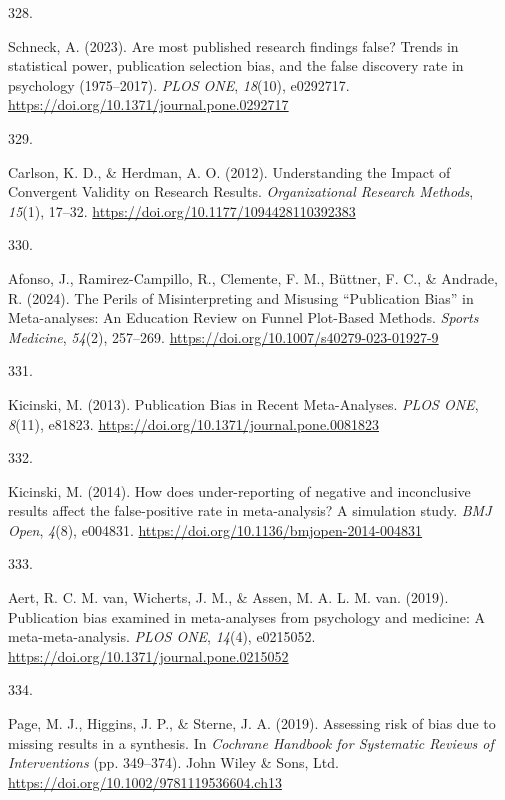 \documentclass[
  11pt,
  letterpaper,
]{scrreprt}
\newlength{\cslhangindent}
\newlength{\csllabelwidth}
\newenvironment{CSLReferences}[2] %
 {\begin{list}{}{%
  \setlength{\itemindent}{0pt}
  \setlength{\leftmargin}{0pt}
  \setlength{\parsep}{0pt}
  \ifodd #1
   \setlength{\leftmargin}{\cslhangindent}
   \setlength{\itemindent}{-1\cslhangindent}
  \fi
  \setlength{\itemsep}{#2\baselineskip}}}
 {\end{list}}
\newcommand{\CSLLeftMargin}[1]{\parbox[t]{\csllabelwidth}{\strut#1\strut}}
\newcommand{\CSLRightInline}[1]{\parbox[t]{\linewidth - \csllabelwidth}{\strut#1\strut}}
\begin{document}
\begin{CSLReferences}{0}{0}
\CSLLeftMargin{328. }%
\CSLRightInline{Schneck, A. (2023). Are most published research findings
false? {Trends} in statistical power, publication selection bias, and
the false discovery rate in psychology (1975--2017). \emph{PLOS ONE},
\emph{18}(10), e0292717.
\url{https://doi.org/10.1371/journal.pone.0292717}}

\CSLLeftMargin{329. }%
\CSLRightInline{Carlson, K. D., \& Herdman, A. O. (2012). Understanding
the {Impact} of {Convergent Validity} on {Research Results}.
\emph{Organizational Research Methods}, \emph{15}(1), 17--32.
\url{https://doi.org/10.1177/1094428110392383}}

\CSLLeftMargin{330. }%
\CSLRightInline{Afonso, J., Ramirez-Campillo, R., Clemente, F. M.,
Büttner, F. C., \& Andrade, R. (2024). The {Perils} of {Misinterpreting}
and {Misusing} {``{Publication Bias}''} in {Meta-analyses}: {An
Education Review} on {Funnel Plot-Based Methods}. \emph{Sports
Medicine}, \emph{54}(2), 257--269.
\url{https://doi.org/10.1007/s40279-023-01927-9}}

\CSLLeftMargin{331. }%
\CSLRightInline{Kicinski, M. (2013). Publication {Bias} in {Recent
Meta-Analyses}. \emph{PLOS ONE}, \emph{8}(11), e81823.
\url{https://doi.org/10.1371/journal.pone.0081823}}

\CSLLeftMargin{332. }%
\CSLRightInline{Kicinski, M. (2014). How does under-reporting of
negative and inconclusive results affect the false-positive rate in
meta-analysis? {A} simulation study. \emph{BMJ Open}, \emph{4}(8),
e004831. \url{https://doi.org/10.1136/bmjopen-2014-004831}}

\CSLLeftMargin{333. }%
\CSLRightInline{Aert, R. C. M. van, Wicherts, J. M., \& Assen, M. A. L.
M. van. (2019). Publication bias examined in meta-analyses from
psychology and medicine: {A} meta-meta-analysis. \emph{PLOS ONE},
\emph{14}(4), e0215052.
\url{https://doi.org/10.1371/journal.pone.0215052}}

\CSLLeftMargin{334. }%
\CSLRightInline{Page, M. J., Higgins, J. P., \& Sterne, J. A. (2019).
Assessing risk of bias due to missing results in a synthesis. In
\emph{Cochrane {Handbook} for {Systematic Reviews} of {Interventions}}
(pp. 349--374). John Wiley \& Sons, Ltd.
\url{https://doi.org/10.1002/9781119536604.ch13}}


\end{CSLReferences}
\end{document}
